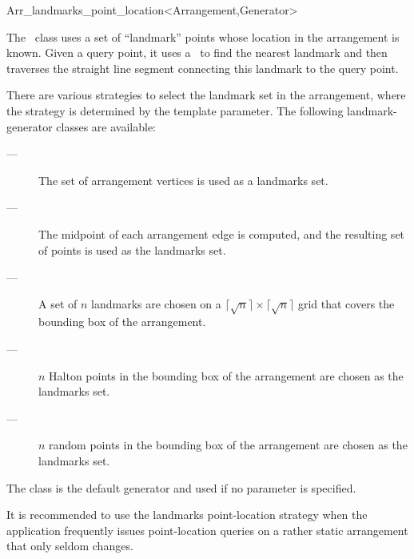 
\ccRefPageBegin

\begin{ccRefClass}{Arr_landmarks_point_location<Arrangement,Generator>}
\label{arr_ref:lm_pl}

The \ccRefName\ class uses a set of ``landmark'' points whose location
in the arrangement is known. Given a query point, it uses a \kdtree\ to
find the nearest landmark and then traverses the straight line
segment connecting this landmark to the query point.

There are various strategies to select the landmark set in the
arrangement, where the strategy is determined by the
 template parameter. The following landmark-generator
classes are available:
\begin{description}
\item[ ---]
The set of arrangement vertices is used as a landmarks set.

\item[ ---]
The midpoint of each arrangement edge is computed, and the resulting
set of points is used as the landmarks set.

\item[ ---]
A set of $n$ landmarks are chosen on a 
$\lceil \sqrt{n} \rceil \times \lceil \sqrt{n} \rceil$ 
grid that covers the bounding box of the arrangement.

\item[ ---]
$n$ Halton points in the bounding box of the arrangement are chosen
as the landmarks set.

\item[ ---]
$n$ random points in the bounding box of the arrangement are chosen
as the landmarks set.
\end{description}
The  class is the default generator
and used if no  parameter is specified.

It is recommended to use the landmarks point-location strategy
when the application frequently issues point-location queries on a
rather static arrangement that only seldom changes.


\ccIsModel
   \\

\end{ccRefClass}

\ccRefPageEnd
